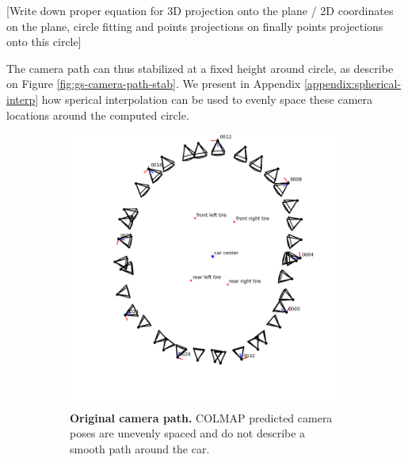 [Write down proper equation for 3D projection onto the plane / 2D coordinates on the plane, circle fitting and points projections on finally points projections onto this circle]

The camera path can thus stabilized at a fixed height around circle, as describe on Figure \ref{fig:gs-camera-path-stab}. We present in Appendix \ref{appendix:spherical-interp} how sperical interpolation can be used to evenly space these camera locations around the computed circle. 


\begin{figure}[htb!]
  \centering
  \begin{subfigure}[b]{0.45\linewidth}
    \includegraphics[width=\linewidth]{images/gaussiansplatting/camera-path-unstabilized.png}
    \caption{\textbf{Original camera path.} COLMAP predicted camera poses are unevenly spaced and do not describe a smooth path around the car. }
\label{fig:gs-camera-path-unstab}
  \end{subfigure}
  \quad %
  \begin{subfigure}[b]{0.45\linewidth}

\end{subfigure}
\end{figure}
